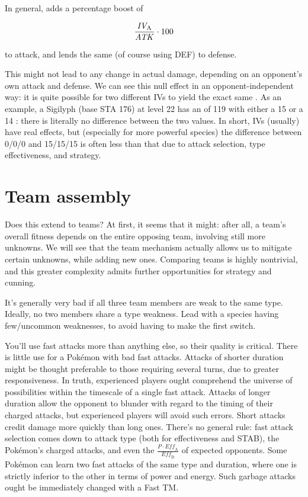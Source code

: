 In general,  adds a percentage boost of

\[ \frac{\mbox{$\mathit{IV_\mathrm{A}}$}}{\mathit{ATK}} \cdot 100 \]

\noindent{}to attack, and  lends the same (of course using DEF) to defense.

This might not lead to any change in actual damage, depending on
  an opponent's own attack and defense.
We can see this null effect in an opponent-independent way: it is quite possible
  for two different IVs to yield the exact same \MHP\@.
As an example, a Sigilyph (base STA 176) at level 22 has an \MHP{} of 119 with
  either a 15 or a 14 : there is literally no difference between the
  two values.
In short, IVs (usually) have real effects, but (especially for more powerful species)
  the difference between 0/0/0 and 15/15/15 is often less than that due to
  attack selection, type effectiveness, and strategy.

\section{Team assembly}
Does this extend to teams?
At first, it seems that it might: after all, a team's overall fitness
 depends on the entire opposing team, involving still more unknowns.
We will see that the team mechanism actually allows us to mitigate certain
 unknowns, while adding new ones.
Comparing teams is highly nontrivial, and this greater complexity admits
 further opportunities for strategy and cunning.

It's generally very bad if all three team members are weak to the same type.
Ideally, no two members share a type weakness.
Lead with a species having few/uncommon weaknesses, to avoid having to make the first switch.

You'll use fast attacks more than anything else, so their quality is critical.
There is little use for a Pokémon with bad fast attacks.
Attacks of shorter duration might be thought preferable to those requiring
  several turns, due to greater responsiveness.
In truth, experienced players ought comprehend the universe of possibilities
  within the timescale of a single fast attack.
Attacks of longer duration allow the opponent to blunder with regard to the
  timing of their charged attacks, but experienced players will avoid
  such errors.
Short attacks credit damage more quickly than long ones.
There's no general rule: fast attack selection comes down to attack type
  (both for effectiveness and STAB), the Pokémon's charged attacks,
  and even the $\frac{P \cdot \mathit{Eff_\mathrm{A}}}{\mathit{Eff_\mathrm{D}}}$ of expected opponents.
Some Pokémon can learn two fast attacks of the same type and duration,
  where one is strictly inferior to the other in terms of power and
  energy.
Such garbage attacks ought be immediately changed with a Fast TM\@.

